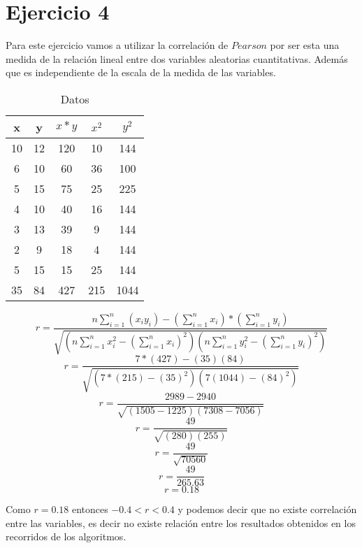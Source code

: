 \documentclass{article}
\begin{document}
	\section*{Ejercicio 4}
		\begin{flushleft}
			Para este ejercicio vamos a utilizar la correlaci\'on de $Pearson$ por ser esta una medida de la relaci\'on lineal entre dos variables aleatorias cuantitativas. Adem\'as que es independiente de la escala de la medida de las variables.
		\end{flushleft}

		\begin{table}
		\caption{Datos}
		\centering
		\begin{tabular}{|c|c|c|c|c|}
			\hline
			x & y & $x*y$ & $x^2$ & $y^2$ \\
			\hline
			10 & 12 & 120 & 10 & 144 \\
			\hline
			6 & 10 & 60 & 36 & 100 \\
			\hline
			5 & 15 & 75 & 25 & 225 \\
			\hline
			4 & 10 & 40 & 16 & 144 \\
			\hline
			3 & 13 & 39 & 9 & 144 \\
			\hline
			2 & 9 & 18 & 4 & 144 \\
			\hline
			5 & 15 & 15 & 25 & 144 \\
			\hline
			35 & 84 & 427 & 215 & 1044 \\
			\hline
		\end{tabular}
		\end{table}
		
		$$r = \frac{n\sum_{i=1}^{n}\left(x_{i}y_{i}\right)-\left(\sum_{i=1}^{n}x_{i}\right)*\left(\sum_{i=1}^{n}y_{i}\right)}{\sqrt{\left(n\sum_{i=1}^{n}x_{i}^{2} - \left(\sum_{i=1}^{n}x_{i}\right)^2\right)\left(n\sum_{i=1}^{n}y_{i}^{2} - \left(\sum_{i=1}^{n}y_{i}\right)^2\right)}}$$
		$$r = \frac{7*\left(427\right)-\left(35\right)\left(84\right)}{\sqrt{\left(7*\left(215\right)-\left(35\right)^2\right)\left(7\left(1044\right)-\left(84\right)^2\right)}}$$
		$$r = \frac{2989 - 2940}{\sqrt{\left(1505 - 1225\right)\left(7308 - 7056\right)}}$$
		$$r = \frac{49}{\sqrt{\left(280\right)\left(255\right)}}$$
		$$r = \frac{49}{\sqrt{70560}}$$
		$$r = \frac{49}{265.63}$$
		$$r = 0.18$$

		\begin{flushleft}
			Como $r = 0.18$ entonces $-0.4 < r < 0.4$ y podemos decir que no existe correlaci\'on entre las variables, es decir no existe relaci\'on entre los resultados obtenidos en los recorridos de los algoritmos.
		\end{flushleft}
	
\end{document}
